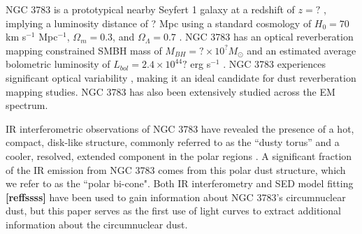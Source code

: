 \par NGC 3783 is a prototypical nearby Seyfert 1 galaxy at a redshift of $z = ?$ , implying a luminosity distance of ? Mpc using a standard cosmology of $H_0 = 70$ km s$^{-1}$ Mpc$^{-1}$, $\Omega_m = 0.3$, and $\Omega_\Lambda = 0.7$ . NGC 3783 has an optical reverberation mapping constrained SMBH mass of $M_{BH} = ? \times 10^? M_\odot$  and an estimated average bolometric luminosity of $L_{bol} = 2.4 \times 10^{44}?$ erg s$^{-1}$ . NGC 3783 experiences significant optical variability , making it an ideal candidate for dust reverberation mapping studies. NGC 3783 has also been extensively studied across the EM spectrum. 

\par IR interferometric observations of NGC 3783 have revealed the presence of a hot, compact, disk-like structure, commonly referred to as the “dusty torus” and a cooler, resolved, extended component in the polar regions \citep{gravity_collaboration_central_2021}. A  significant fraction of the IR emission from NGC 3783 comes from this polar dust structure, which we refer to as the “polar bi-cone". Both IR interferometry and SED model fitting { \bf [reffssss]} have been used to gain information about NGC 3783’s circumnuclear dust, but this paper serves as the first use of light curves to extract additional information about the circumnuclear dust.

